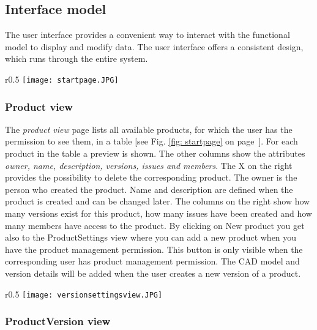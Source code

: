 \subsection{Interface model}

The user interface provides a convenient way to interact with the functional model to display and modify data. The user interface offers a consistent design, which runs through the entire system.

\begin{wrapfigure}{r}{0.5\textwidth}
    \centering
    \texttt{[image: startpage.JPG]}
    \caption{Product view}
    \label{fig: startpage}
\end{wrapfigure}

\subsubsection*{Product view}

The \textit{product view} page lists all available products, for which the user has the permission to see them, in a table [see Fig. \ref{fig: startpage} on page~\pageref{fig: startpage}]. For each product in the table a preview is shown. The other columns show the attributes \textit{owner, name, description, versions, issues and members}. The X on the right provides the possibility to delete the corresponding product. The owner is the person who created the product. Name and description are defined when the product is created and can be changed later. The columns on the right show how many versions exist for this product, how many issues have been created and how many members have access to the product. By clicking on New product you get also to the ProductSettings view where you can add a new product when you have the product management permission. This button is only visible when the corresponding user has product management permission. The CAD model and version details will be added when the user creates a new version of a product.

\begin{wrapfigure}{r}{0.5\textwidth}
    \centering
    \texttt{[image: versionsettingsview.JPG]}
    \caption{ProductVersionSettings view}
    \label{fig: versionsettingsview}
\end{wrapfigure}

\subsubsection*{ProductVersion view}

